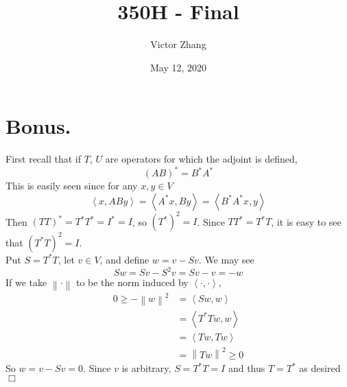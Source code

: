 \documentclass{article}
\title{350H - Final}
\author{Victor Zhang}
\date{May 12, 2020}
\newcommand{\innerprod}[2]{\left\langle #1 , #2 \right\rangle}
\newcommand{\norm}[1]{\left\lVert#1\right\rVert}
\begin{document}
\maketitle

\section*{Bonus.}
First recall that if $T$, $U$ are operators for which the adjoint is defined,
$$(AB)^* = B^*A^*$$
This is easily seen since for any $x,y \in V$
$$\innerprod{x}{ABy} = \innerprod{A^*x}{By} = \innerprod{B^*A^*x}{y}$$
Then $(TT)^* = T^*T^* = I^* = I$, so $(T^*)^2 = I$. Since $TT^* = T^*T$, it is easy to see that $(T^*T)^2 = I$.\\
Put $S = T^*T$, let $v \in V$, and define $w = v - Sv$. We may see
$$Sw = Sv - S^2v = Sv - v = -w$$
If we take $\norm{\cdot}$ to be the norm induced by $\innerprod{\cdot}{\cdot}$,
\begin{equation*}
\begin{split}
    0 \geq -\norm{w}^2 &= \innerprod{Sw}{w}\\
    &= \innerprod{T^*Tw}{w}\\
    &= \innerprod{Tw}{Tw}\\
    &= \norm{Tw}^2 \geq 0
\end{split}
\end{equation*}
So $w = v - Sv = 0$. Since $v$ is arbitrary, $S = T^*T = I$ and thus $T =T^*$ as desired $\Box$
\end{document}
